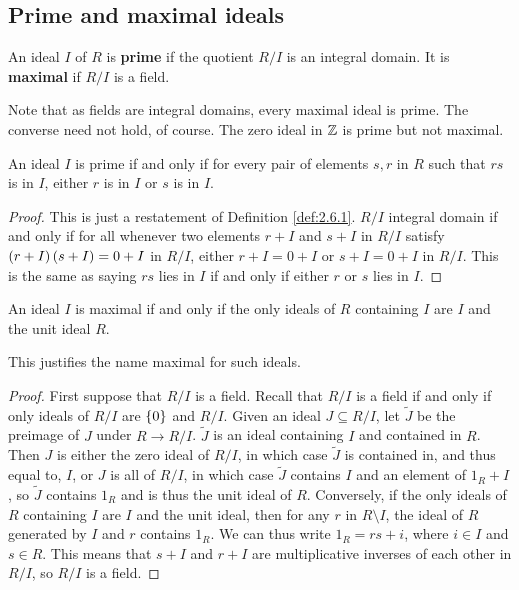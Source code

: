 
\subsection{Prime and maximal ideals}

\begin{definition}
\label{def:2.6.1}
An ideal $ I $ of $ R $ is \textbf{prime} if the quotient $ R / I $ is an integral domain. It is \textbf{maximal} if $ R / I $ is a field.
\end{definition}

Note that as fields are integral domains, every maximal ideal is prime. The converse need not hold, of course. The zero ideal in $ \mathbb{Z} $ is prime but not maximal.

\begin{lemma}
An ideal $ I $ is prime if and only if for every pair of elements $ s, r $ in $ R $ such that $ rs $ is in $ I $, either $ r $ is in $ I $ or $ s $ is in $ I $.
\end{lemma}

\begin{proof}
This is just a restatement of Definition \ref{def:2.6.1}. $ R / I $ integral domain if and only if for all whenever two elements $ r + I $ and $ s + I $ in $ R / I $ satisfy $ \left( r + I \right)\left( s + I \right) = 0 + I $ in $ R / I $, either $ r + I = 0 + I $ or $ s + I = 0 + I $ in $ R / I $. This is the same as saying $ rs $ lies in $ I $ if and only if either $ r $ or $ s $ lies in $ I $.
\end{proof}

\begin{lemma}
An ideal $ I $ is maximal if and only if the only ideals of $ R $ containing $ I $ are $ I $ and the unit ideal $ R $.
\end{lemma}

This justifies the name maximal for such ideals.

\begin{proof}
First suppose that $ R / I $ is a field. Recall that $ R / I $ is a field if and only if only ideals of $ R / I $ are $ \left\{ 0 \right\} $ and $ R / I $. Given an ideal $ J \subseteq R / I $, let $ \widetilde{J} $ be the preimage of $ J $ under $ R \to R / I $. $ \widetilde{J} $ is an ideal containing $ I $ and contained in $ R $. Then $ J $ is either the zero ideal of $ R / I $, in which case $ \widetilde{J} $ is contained in, and thus equal to, $ I $, or $ J $ is all of $ R / I $, in which case $ \widetilde{J} $ contains $ I $ and an element of $ 1_R + I $, so $ \widetilde{J} $ contains $ 1_R $ and is thus the unit ideal of $ R $. Conversely, if the only ideals of $ R $ containing $ I $ are $ I $ and the unit ideal, then for any $ r $ in $ R \setminus I $, the ideal of $ R $ generated by $ I $ and $ r $ contains $ 1_R $. We can thus write $ 1_R = rs + i $, where $ i \in I $ and $ s \in R $. This means that $ s + I $ and $ r + I $ are multiplicative inverses of each other in $ R / I $, so $ R / I $ is a field.
\end{proof}

